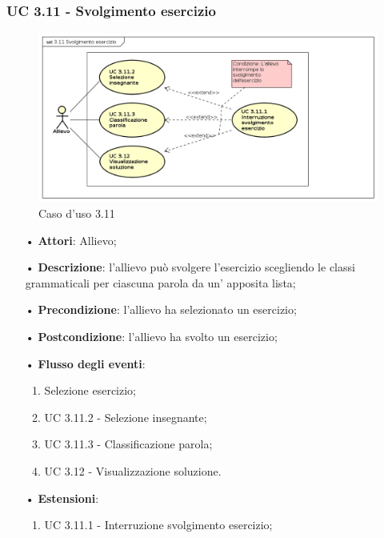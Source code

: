 \subsubsection{UC 3.11 - Svolgimento esercizio}
\begin{figure}[H]
	\centering
	\includegraphics[width=17cm]{img/UC311.png} 
	\caption{Caso d'uso 3.11}\label{fig:311}
\end{figure}
\begin{itemize}
	\item[•]\textbf{Attori}: Allievo;
	\item[•]\textbf{Descrizione}: l'allievo può svolgere l'esercizio scegliendo le classi grammaticali per ciascuna parola da un' apposita lista;
	\item[•]\textbf{Precondizione}: l'allievo ha selezionato un esercizio;
	\item[•]\textbf{Postcondizione}: l'allievo ha svolto un esercizio;
	\item[•]\textbf{Flusso degli eventi}:
	\begin{enumerate}
		\item Selezione esercizio;
		\item UC 3.11.2 - Selezione insegnante;
		\item UC 3.11.3 - Classificazione parola;
		\item UC 3.12 - Visualizzazione soluzione.
	\end{enumerate}
	\item[•]\textbf{Estensioni}:
	\begin{enumerate}
		\item UC 3.11.1 - Interruzione svolgimento esercizio;
	\end{enumerate}
\end{itemize}

